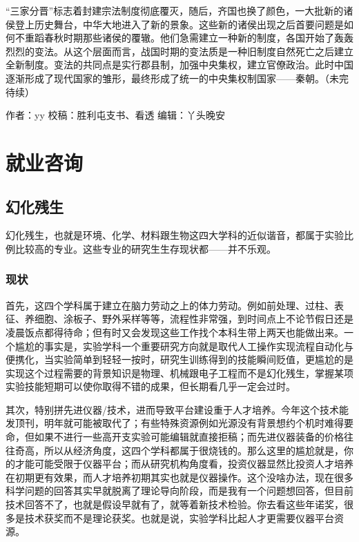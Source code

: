 \documentclass[]{book}
\begin{document}
``三家分晋''标志着封建宗法制度彻底覆灭，随后，齐国也换了颜色，一大批新的诸侯登上历史舞台，中华大地进入了新的景象。这些新的诸侯出现之后首要问题是如何不重蹈春秋时期那些诸侯的覆辙。他们急需建立一种新的制度，各国开始了轰轰烈烈的变法。从这个层面而言，战国时期的变法质是一种旧制度自然死亡之后建立全新制度。变法的共同点是实行郡县制，加强中央集权，建立官僚政治。此时中国逐渐形成了现代国家的雏形，最终形成了统一的中央集权制国家------秦朝。（未完待续）

作者：yy 校稿：胜利屯支书、看透 编辑：丫头晚安

\chapter{就业咨询}

\section{幻化残生}

幻化残生，也就是环境、化学、材料跟生物这四大学科的近似谐音，都属于实验比例比较高的专业。这些专业的研究生生存现状都------并不乐观。

\subsection{现状}

首先，这四个学科属于建立在脑力劳动之上的体力劳动。例如前处理、过柱、表征、养细胞、涂板子、野外采样等等，流程性非常强，到时间点上不论节假日还是凌晨饭点都得待命；但有时又会发现这些工作找个本科生带上两天也能做出来。一个尴尬的事实是，实验学科一个重要研究方向就是取代人工操作实现流程自动化与便携化，当实验简单到轻轻一按时，研究生训练得到的技能瞬间贬值，更尴尬的是实现这个过程需要的背景知识是物理、机械跟电子工程而不是幻化残生，掌握某项实验技能短期可以使你取得不错的成果，但长期看几乎一定会过时。

其次，特别拼先进仪器/技术，进而导致平台建设重于人才培养。今年这个技术能发顶刊，明年就可能被取代了；有些特殊资源例如光源没有背景想约个机时难得要命，但如果不进行一些高开支实验可能编辑就直接拒稿；而先进仪器装备的价格往往奇高，所以从经济角度，这四个学科都属于很烧钱的。那么这里的尴尬就是，你的才能可能受限于仪器平台；而从研究机构角度看，投资仪器显然比投资人才培养在初期更有效果，而人才培养初期其实也就是仪器操作。这个没啥办法，现在很多科学问题的回答其实早就脱离了理论导向阶段，而是我有一个问题想回答，但目前技术回答不了，也就是假设早就有了，就等着新技术检验。你去看这些年诺奖，很多是技术获奖而不是理论获奖。也就是说，实验学科比起人才更需要仪器平台资源。
\end{document}
